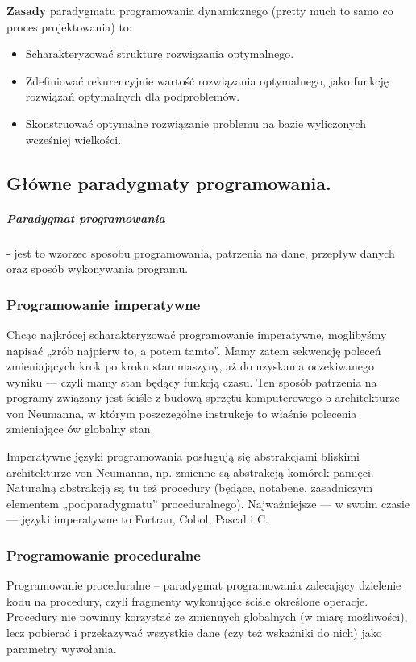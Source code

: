 \documentclass[a4paper,12pt,oneside]{book}
\begin{document}
				\textbf{Zasady} paradygmatu programowania dynamicznego (pretty much to samo co proces projektowania) to:
				\begin{itemize}
					\item Scharakteryzować strukturę rozwiązania optymalnego.
					\item Zdefiniować rekurencyjnie wartość rozwiązania optymalnego, jako funkcję rozwiązań optymalnych dla podproblemów.
					\item Skonstruować optymalne rozwiązanie problemu na bazie wyliczonych wcześniej wielkości.
				\end{itemize}
			
			\newpage\subsection{Główne paradygmaty programowania.}
				\subparagraph{Paradygmat programowania} - jest to wzorzec sposobu programowania, patrzenia na dane,
				przepływ danych oraz sposób wykonywania programu.
				
				\subsubsection{Programowanie imperatywne}
				Chcąc najkrócej scharakteryzować programowanie imperatywne, moglibyśmy napisać „zrób najpierw to, a potem tamto”. Mamy zatem sekwencję poleceń zmieniających krok po kroku stan maszyny, aż do uzyskania oczekiwanego wyniku — czyli mamy stan będący funkcją czasu. Ten sposób patrzenia na programy związany jest ściśle z budową sprzętu komputerowego o architekturze von Neumanna, w którym poszczególne instrukcje to właśnie polecenia zmieniające ów globalny stan.
				
				Imperatywne języki programowania posługują się abstrakcjami bliskimi architekturze von Neumanna, np. zmienne są abstrakcją komórek pamięci. Naturalną abstrakcją są tu też procedury (będące, notabene, zasadniczym elementem „podparadygmatu” proceduralnego). Najważniejsze — w swoim czasie — języki imperatywne to Fortran, Cobol, Pascal i C.
				
				\subsubsection{Programowanie proceduralne}
				Programowanie proceduralne – paradygmat programowania zalecający dzielenie kodu na procedury, czyli fragmenty wykonujące ściśle określone operacje. Procedury nie powinny korzystać ze zmiennych globalnych (w miarę możliwości), lecz pobierać i przekazywać wszystkie dane (czy też wskaźniki do nich) jako parametry wywołania.
				
\end{document}
